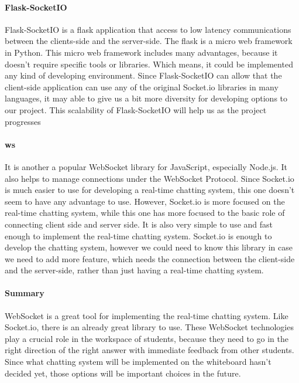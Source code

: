 \documentclass[10pt]{article}
\begin{document}
            \paragraph{Flask-SocketIO }
                Flask-SocketIO is a flask application that access to low latency communications between the clients-side and the server-side. The flask is a micro web framework in Python. This micro web framework includes many advantages, because it doesn’t require specific tools or libraries. Which means, it could be implemented any kind of developing environment. Since Flask-SocketIO can allow that the client-side application can use any of the original Socket.io libraries in many languages, it may able to give us a bit more diversity for developing options to our project. This scalability of Flask-SocketIO will help us as the project progresses \cite{fs}

            \paragraph{ws}
                It is another a popular WebSocket library for JavaScript, especially Node.js. It also helps to manage connections under the WebSocket Protocol. Since Socket.io is much easier to use for developing a real-time chatting system, this one doesn’t seem to have any advantage to use. However, Socket.io is more focused on the real-time chatting system, while this one has more focused to the basic role of connecting client side and server side. It is also very simple to use and fast enough to implement the real-time chatting system. Socket.io is enough to develop the chatting system, however we could need to know this library in case we need to add more feature, which needs the connection between the client-side and the server-side, rather than just having a real-time chatting system. \cite{ws}

            \paragraph{Summary}
                WebSocket is a great tool for implementing the real-time chatting system. Like Socket.io, there is an already great library to use.  These WebSocket technologies play a crucial role in the workspace of students, because they need to go in the right direction of the right answer with immediate feedback from other students. Since what chatting system will be implemented on the whiteboard hasn’t decided yet, those options will be important choices in the future.
\end{document}

